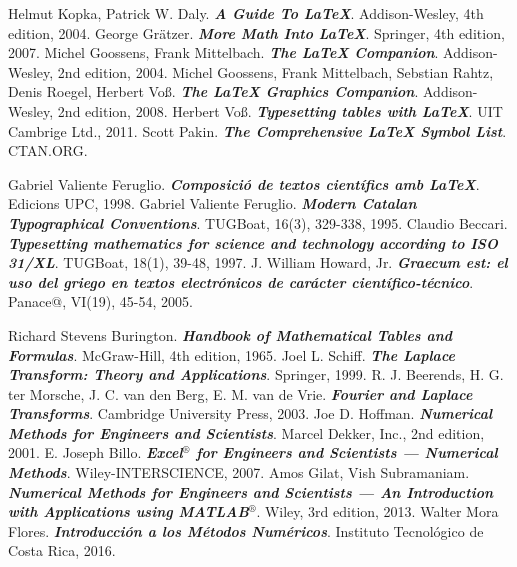 \begin{thebibliography}{99}


     Helmut Kopka, Patrick W. Daly. \textbf{\textit{A Guide To \LaTeX}}.  Addison-Wesley, 4th edition, 2004.
     George Grätzer. \textbf{\textit{More Math Into \LaTeX}}.  Springer, 4th edition, 2007.
     Michel Goossens, Frank Mittelbach. \textbf{\textit{The \LaTeX{} Companion}}.  Addison-Wesley, 2nd edition, 2004.
     Michel Goossens, Frank Mittelbach, Sebstian Rahtz, Denis Roegel, Herbert Voß. \textbf{\textit{The \LaTeX{} Graphics Companion}}.  Addison-Wesley, 2nd edition, 2008.
     Herbert Voß. \textbf{\textit{Typesetting tables with \LaTeX{}}}.  UIT Cambrige Ltd., 2011.
     Scott Pakin. \textbf{\textit{The Comprehensive \LaTeX{} Symbol List}}. CTAN.ORG.

     Gabriel Valiente Feruglio. \textbf{\textit{Composició de textos científics amb \LaTeX}}.  Edicions UPC, 1998.
     Gabriel Valiente Feruglio. \textbf{\textit{Modern Catalan Typographical Conventions}}.  TUGBoat, 16(3), 329-338, 1995.
     Claudio Beccari. \textbf{\textit{Typesetting mathematics for science and technology according to ISO 31/XL}}.  TUGBoat, 18(1), 39-48, 1997.
     J. William Howard, Jr. \textbf{\textit{Graecum est: el uso del griego en textos electrónicos de carácter científico-técnico}}.  Panace@, VI(19), 45-54, 2005.

     Richard Stevens Burington. \textbf{\textit{Handbook of Mathematical Tables and Formulas}}.  McGraw-Hill, 4th edition, 1965.
     Joel L. Schiff. \textbf{\textit{The Laplace Transform: Theory and Applications}}.  Springer, 1999.
     R. J. Beerends, H. G. ter Morsche, J. C. van den Berg, E. M. van de Vrie. \textbf{\textit{Fourier and Laplace Transforms}}.  Cambridge University Press, 2003.
     Joe D. Hoffman. \textbf{\textit{Numerical Methods for Engineers and Scientists}}.  Marcel Dekker, Inc., 2nd edition, 2001.
     E. Joseph Billo. \textbf{\textit{Excel${}^\circledR$ for Engineers and Scientists --- Numerical Methods}}.  Wiley-INTERSCIENCE, 2007.
     Amos Gilat, Vish Subramaniam. \textbf{\textit{Numerical Methods for Engineers and Scientists ---
        An Introduction with Applications using MATLAB${}^\circledR$}}.  Wiley, 3rd edition, 2013.
     Walter Mora Flores. \textbf{\textit{Introducción a los Métodos Numéricos}}.  Instituto Tecnológico de Costa Rica, 2016.


\end{thebibliography}
